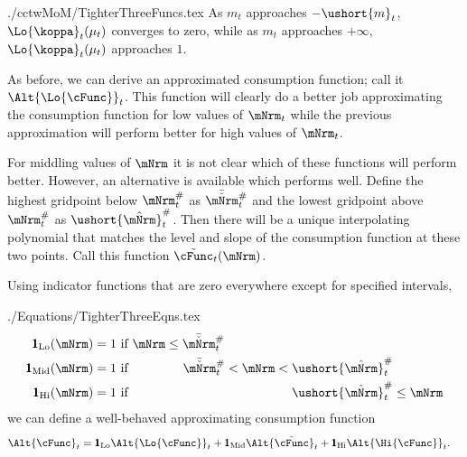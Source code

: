 \documentclass[titlepage, headings=optiontotocandhead]{\econtex}
\begin{document}
\begin{verbatimwrite}{./cctwMoM/TighterThreeFuncs.tex}
  As $m_{t}$ approaches
  $-\ushort{m}_{t}$, $\Lo{\koppa}_{t}(\mu_{t})$ converges to zero, while as $m_{t}$
  approaches $+\infty$, $\Lo{\koppa}_{t}(\mu_{t})$ approaches $1$.  

  As before, we can derive an approximated consumption function; call it
  $\Alt{\Lo{\cFunc}}_{t}$.  This function will clearly do a better job approximating the consumption
  function for low values of $\mNrm_{t}$ while the previous approximation will perform better
  for high values of $\mNrm_{t}$.  

  For middling values of $\mNrm$ it is not clear which of these
  functions will perform better.  However, an alternative is available
  which performs well.  Define the highest gridpoint below $\mtCusp$ as
  $\bar{\check{\mNrm}}_{t}^{\#}$ and the lowest gridpoint above $\mtCusp$ as
  $\ushort{\hat{\mNrm}}_{t}^{\#}$.  Then there will be a unique interpolating
  polynomial that matches the level and slope of the consumption function
  at these two points.  Call this function $\tilde{\cFunc}_{t}(\mNrm)$.  

  Using indicator functions that are zero everywhere except for specified intervals,
\end{verbatimwrite}
\unskip
\begin{verbatimwrite}{./Equations/TighterThreeEqns.tex}
  \begin{equation*}\begin{gathered}\begin{aligned}
        \pmb{1}_{\text{Lo}}(\mNrm)  & = 1 \text{~if $          \mNrm \leq  \bar{\check{\mNrm}}_{t}^{\#} \phantom{< \mNrm <   \ushort{\hat{\mNrm}}_{t}^{\#}          \leq \mNrm}$}
        \\  \pmb{1}_{\text{Mid}}(\mNrm)  & = 1 \text{~if $\phantom{ \mNrm \leq}~ \bar{\check{\mNrm}}_{t}^{\#}          < \mNrm <   \ushort{\hat{\mNrm}}_{t}^{\#} \phantom{\leq \mNrm}$}
        \\  \pmb{1}_{\text{Hi}}(\mNrm)  & = 1 \text{~if $\phantom{ \mNrm \leq  ~\bar{\check{\mNrm}}_{t}^{\#}          < \mNrm < } \ushort{\hat{\mNrm}}_{t}^{\#}           \leq \mNrm$}
      \end{aligned}\end{gathered}\end{equation*}
  we can define a well-behaved approximating consumption function
  \begin{equation}\begin{gathered}\begin{aligned}
        \Alt{\cFunc}_{t}  & = \pmb{1}_{\text{Lo}} \Alt{\Lo{\cFunc}}_{t} + \pmb{1}_{\text{Mid}} \Alt{\tilde{\cFunc}}_{t}+\pmb{1}_{\text{Hi}} \Alt{\Hi{\cFunc}}_{t}.
      \end{aligned}\end{gathered}\end{equation} 
\end{verbatimwrite}
\unskip
\end{document}
